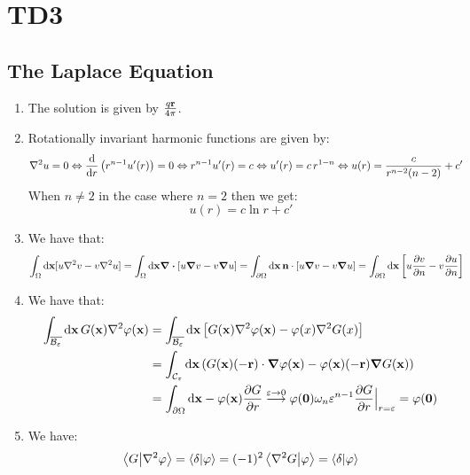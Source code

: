 \documentclass[10pt,a4paper]{book}
\begin{document}
\chapter{TD3}

\section{The Laplace Equation}

\begin{enumerate}

\item The solution is given by $\frac{q \vb{r}}{4\pi}$. 

\item Rotationally invariant harmonic functions are given by:
\begin{align*}
\laplacian u = 0 &\Leftrightarrow \dv{}{r} \left(r^{n-1} u'(r)\right) = 0 \Leftrightarrow r^{n-1} u'(r) = c \Leftrightarrow u'(r) = c\, r^{1 - n} \Leftrightarrow u(r) = \frac{c}{r^{n-2} (n - 2)} + c'
\end{align*}
When $n\neq 2$ in the case where $n = 2$ then we get:
\[
u(r) = c \ln r + c'
\]

\item We have that:
\begin{align*}
\int_\Omega \dd \vb{x} [u \laplacian v - v \laplacian u] &= \int_{\Omega} \dd \vb{x} \div [ u \grad v - v \grad u ] = \int_{\partial \Omega} \dd \vb{x}\, \vb{n} \cdot [u \grad v - v \grad u] = \int_{\partial \Omega} \dd \vb{x} \left[ u \pdv{v}{n} - v \pdv{u}{n} \right]
\end{align*}

\item We have that:
\begin{align*}
\int_{\overline{\mathcal{B}_\varepsilon}} \dd \vb{x}\, G(\vb{x}) \laplacian \varphi(\vb{x}) &= \int_{\overline{\mathcal{B}_\varepsilon}} \dd\vb{x} \left[ G(\vb{x}) \laplacian \varphi(\vb{x}) - \varphi(x) \laplacian G(x) \right]\\
&= \int_{\mathcal{C}_\varepsilon} \dd \vb{x} \left( G(\vb{x}) (-\vb{r}) \cdot \grad \varphi(\vb{x}) - \varphi(\vb{x}) (-\vb{r}) \grad G(\vb{x}) \right)\\
&= \int_{\partial \Omega} \dd \vb{x} -\varphi(\vb{x})\pdv{G}{r} \stackrel{\varepsilon \to 0}{\longrightarrow} \varphi(\vb{0}) \omega_n \varepsilon^{n-1} \pdv{G}{r}\Big|_{r = \varepsilon} = \varphi(\vb{0})
\end{align*} 

\item We have:
\[
\bra{G}\ket{\laplacian \varphi} = \bra{\delta}\ket{\varphi} = (-1)^2 \bra{\laplacian G}\ket{\varphi} = \bra{\delta}\ket{\varphi}
\]

\end{enumerate}
\end{document}
